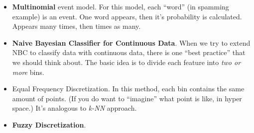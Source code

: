 \documentclass[twocolumn]{article}
\begin{document}
\begin{itemize}
\item \textbf{Multinomial} event model. For this model, each ``word''
  (in spamming example) is an event. One word appears, then it's
  probability is calculated. Appears many times, then times as many.
\item \textbf{Naive Bayesian Classifier for Continuous Data}. When we
  try to extend NBC to classify data with continuous data, there is
  one ``best practice'' that we should think about. The basic idea is
  to divide each feature into \emph{two or more} bins. 
\item Equal Frequency Discretization. In this method, each bin
  contains the same amount of points. (If you do want to ``imagine''
  what point is like, in hyper space.) It's analogous to \emph{k-NN}
  approach. 
\item \textbf{Fuzzy Discretization}.
\end{itemize}
\end{document}
